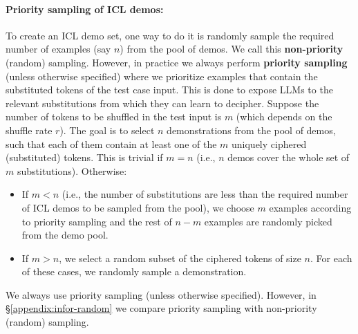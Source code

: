 \documentclass[11pt]{article}
\newcommand{\daniel}[1]{{\color{purple}[{\bf DK}: #1]}}
\newcommand{\aayush}[1]{{\color{green}[{\bf Aayush}: #1]}}
\begin{document}
\paragraph{Priority sampling of ICL demos:}
\label{subsec:sampling}
To create an ICL demo set, one way to do it is randomly sample the required number of examples (say $n$) from the pool of demos. We call this \textbf{non-priority} (random) sampling.
However, in practice we always perform \textbf{priority sampling} (unless otherwise specified) where we prioritize examples that contain
the substituted tokens of the test case input.
This is done to expose LLMs to the relevant substitutions from which they can learn to decipher.
Suppose the number of tokens to be shuffled in the test input is $m$ (which depends on the shuffle rate $r$).
The goal is to select $n$ demonstrations from the pool of demos, such that each of them contain at least one of the $m$ uniquely ciphered (substituted) tokens.
This is trivial if $m=n$ (i.e., $n$ demos cover the whole set of $m$ substitutions). Otherwise:
\begin{itemize}[noitemsep,leftmargin=10pt,topsep=1pt]
 \item   If $m < n$ (i.e., the number of substitutions are less than the required number of ICL demos to be sampled from the pool), we choose $m$ examples according to priority sampling and the rest of $n-m$ examples are randomly picked from the demo pool.
 \item  If $m > n$, we select a random subset of the ciphered tokens of size $n$. For each of these cases, we randomly sample a demonstration.
\end{itemize}
We always use priority sampling (unless otherwise specified). However, in \S\ref{appendix:infor-random} we compare priority sampling with non-priority (random) sampling.
\end{document}
